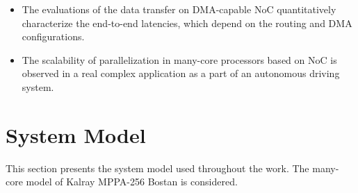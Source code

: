 \documentclass[conference,compsoc]{IEEEtran}
\newcommand{\comment}[1]{}
\begin{document}
\vspace{-3mm}
\begin{itemize}
\setlength{\leftskip}{-5mm}
\item The evaluations of the data transfer on DMA-capable NoC quantitatively characterize the end-to-end latencies, which depend on the routing and DMA configurations.
\item The scalability of parallelization in many-core processors based on NoC is observed in a real complex application as a part of an autonomous driving system.
\end{itemize}
\vspace{-3mm}

\comment{1-8, 1-9}



\vspace{-2mm}
\section{System Model}
\label{sec:system_model}
\vspace{-3mm}
This section presents the system model used throughout the work.
The many-core model of Kalray MPPA-256 Bostan is considered.
\end{document}
